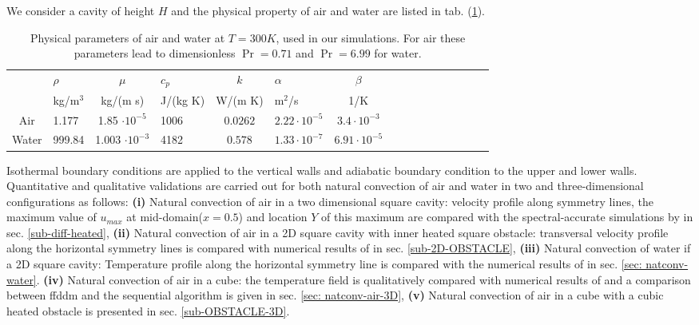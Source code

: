 We consider a cavity of height $H$ and the physical property of air and water are listed in tab. (\ref{tab-param-phys-air}).
\begin{table}[ht!]
   \begin{center}
      \begin{tabular}{*{8}{cl}}
         
        & $\rho$ &$ \mu$ & $c_p $ & $k$ & $\alpha $ & $\beta$ \\
        & kg/m$^3$& kg/(m s) & J/(kg K) & W/(m K) & m$^2$/s & 1/K \\
         \hline
        Air & 1.177 & 1.85 $\cdot 10^{-5}$  & 1006 & $0.0262$ & $2.22 \cdot 10^{-5}$ & $3.4 \cdot 10^{-3}$ \\
        Water & 999.84 & 1.003 $\cdot 10^{-3}$  & 4182 & $0.578$ & $1.33 \cdot 10^{-7}$ & $6.91 \cdot 10^{-5}$
      \end{tabular}
   \end{center}
   \caption{Physical parameters of air and water at $T = 300K$, used in our simulations. For air these parameters lead to dimensionless $\Pr = 0.71$ and $\Pr = 6.99$ for water.}
   \label{tab-param-phys-air}
\end{table}

Isothermal boundary conditions are applied to the vertical walls and adiabatic boundary condition to the upper and lower walls.
Quantitative and qualitative validations are carried out for both natural convection of air and water in two and three-dimensional configurations as follows: \newline{}
{\bf(i)} Natural convection of air in a two dimensional square cavity: velocity profile along symmetry lines, the maximum value of $u_{max}$ at mid-domain($x=0.5$) and location $Y$ of this maximum  are compared with the spectral-accurate simulations by \cite{LeQuere91} in sec. \ref{sub-diff-heated}, \newline{}
{\bf(ii)} Natural convection of air in a 2D square cavity with inner heated square obstacle: transversal velocity profile along the  horizontal symmetry lines is compared with numerical results of \cite{Raluca2013} 
in sec. \ref{sub-2D-OBSTACLE}, \newline{}
{\bf(iii)} Natural convection of water if a 2D square cavity: Temperature profile along the horizontal symmetry line is compared with the numerical results of \cite{Kowalewski-2003} in sec. \ref{sec: natconv-water}.
{\bf(iv)} Natural convection of air in a cube: the temperature field is qualitatively compared with numerical results of \cite{Wakashima-2004} and a comparison between ffddm and the sequential algorithm is given in 
sec. \ref{sec: natconv-air-3D}, \newline{}
{\bf(v)} Natural convection of air in a cube with a cubic heated obstacle is presented in sec. \ref{sub-OBSTACLE-3D}.

